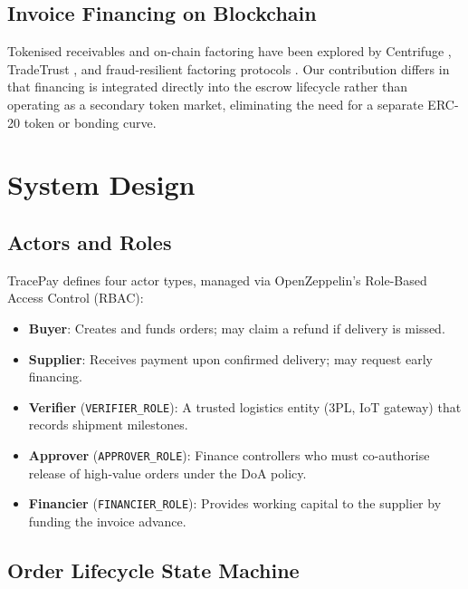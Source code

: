 \documentclass[conference]{IEEEtran}
\begin{document}
\subsection{Invoice Financing on Blockchain}

Tokenised receivables and on-chain factoring have been explored
by Centrifuge \cite{centrifuge2020}, TradeTrust \cite{tradetrust2020},
and fraud-resilient factoring protocols \cite{guerar2020}.
Our contribution differs in that financing is integrated directly
into the escrow lifecycle rather than operating as a secondary
token market, eliminating the need for a separate ERC-20 token
or bonding curve.

\section{System Design}
\label{sec:design}

\subsection{Actors and Roles}

TracePay defines four actor types, managed via OpenZeppelin's
Role-Based Access Control (RBAC):

\begin{itemize}
  \item \textbf{Buyer}: Creates and funds orders; may claim a refund
        if delivery is missed.
  \item \textbf{Supplier}: Receives payment upon confirmed delivery;
        may request early financing.
  \item \textbf{Verifier} (\texttt{VERIFIER\_ROLE}): A trusted
        logistics entity (3PL, IoT gateway) that records
        shipment milestones.
  \item \textbf{Approver} (\texttt{APPROVER\_ROLE}): Finance
        controllers who must co-authorise release of high-value orders
        under the DoA policy.
  \item \textbf{Financier} (\texttt{FINANCIER\_ROLE}): Provides
        working capital to the supplier by funding the invoice advance.
\end{itemize}

\subsection{Order Lifecycle State Machine}
\end{document}
